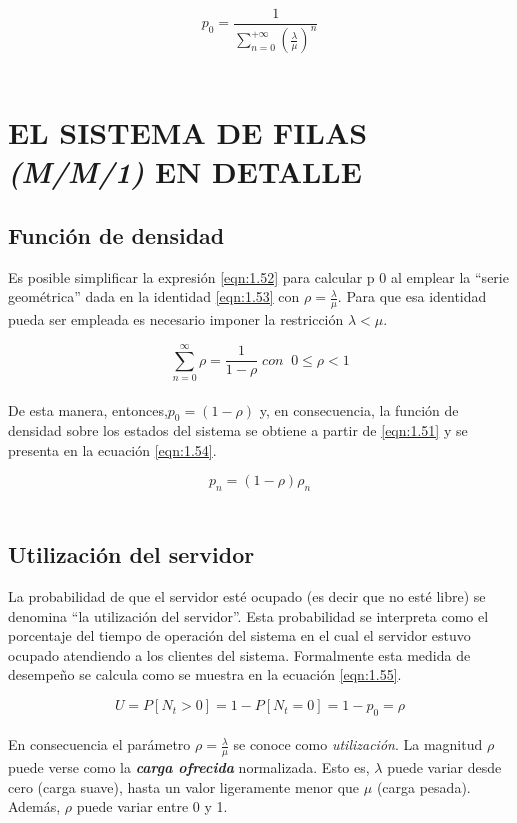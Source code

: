 \begin{equation}
    p_{0}=\frac{1}{\displaystyle\sum_{n=0}^{+\infty }\left ( \frac{\lambda}{\mu} \right )^{n}}
    \label{eqn:1.52}
\end{equation}
\\
\section{EL SISTEMA DE FILAS \textit{(M/M/1)} EN DETALLE}
\subsection{Función de densidad}
Es posible simplificar la expresión \ref{eqn:1.52} para calcular p 0 al emplear la “serie geométrica” dada en la identidad \ref{eqn:1.53} con $ \rho = \frac{\lambda}{\mu} $. Para que esa identidad pueda ser empleada es necesario imponer la restricción $ \lambda < \mu $.

\begin{equation}
    \sum_{n=0}^{\infty }\rho=\frac{1}{1-\rho} \; con\;\; 0\leq \rho< 1
    \label{eqn:1.53}
\end{equation}
\\
De esta manera, entonces,$ p_{0}= \left ( 1-\rho \right ) $ y, en consecuencia, la función de densidad sobre los estados del sistema se obtiene a partir de \ref{eqn:1.51} y se presenta en la ecuación \ref{eqn:1.54}.

\begin{equation}
    p_{n}=\left ( 1-\rho \right )\rho_{n}
    \label{eqn:1.54}
\end{equation}
\\
\subsection{Utilización del servidor}
La probabilidad de que el servidor esté ocupado (es decir que no esté libre) se denomina “la utilización del servidor”. Esta probabilidad se interpreta como el porcentaje del tiempo de operación del sistema en el cual el servidor estuvo ocupado atendiendo a los clientes del sistema. Formalmente esta medida de desempeño se calcula como se muestra en la ecuación \ref{eqn:1.55}.

\begin{equation}
    U=P\left [ N_{t}> 0 \right ]=1-P\left [ N_{t}=0 \right ]=1-p_{0}=\rho
    \label{eqn:1.55}
\end{equation}
\\
En consecuencia el parámetro $ \rho = \frac{\lambda}{\mu} $ se conoce como {\em utilización}. La magnitud $ \rho $ puede verse como la \textbf{\textit{carga ofrecida}} normalizada. Esto es, $ \lambda $ puede variar desde cero (carga suave), hasta un valor ligeramente menor que $ \mu $ (carga pesada). Además, $ \rho $ puede variar entre 0 y 1. \\


